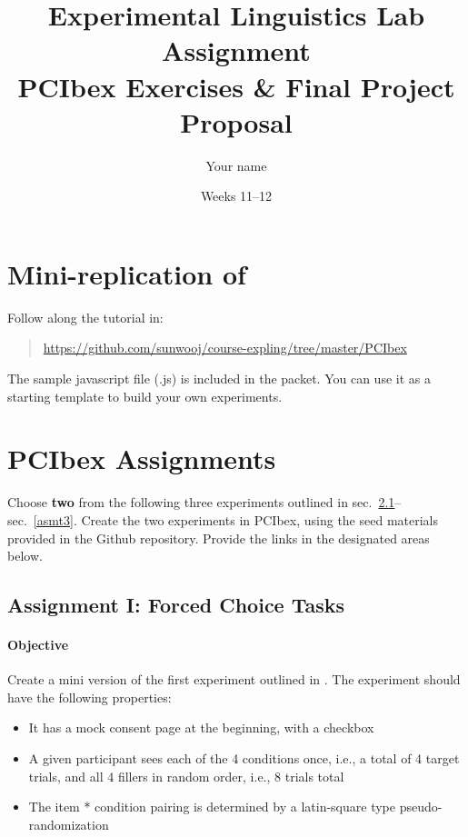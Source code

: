 \documentclass{article}
\title{Experimental Linguistics Lab Assignment \\ PCIbex Exercises \& Final Project Proposal}
\date{Weeks 11--12}
\author{Your name}
\begin{document}
\maketitle

\section{Mini-replication of \cite{sprouse2016}}

Follow along the tutorial in: 

\begin{quotation}
\noindent
\url{https://github.com/sunwooj/course-expling/tree/master/PCIbex}
\end{quotation}

\noindent The sample javascript file (.js) is included in the packet. You can use it as a starting template to build your own experiments.




\section{PCIbex Assignments}

Choose \textbf{two} from the following three experiments outlined in sec.~\ref{asmt1}--sec.~\ref{asmt3}. Create the two experiments in PCIbex, using the seed materials provided in the Github repository. Provide the links in the designated areas below.




\subsection{Assignment I: Forced Choice Tasks}\label{asmt1}

\paragraph{Objective} Create a mini version of the first experiment outlined in \cite{brasoveanu2015}. The experiment should have the following properties:

\begin{itemize}
    \item It has a mock consent page at the beginning, with a checkbox
    \item A given participant sees each of the 4 conditions once, i.e., a total of 4 target trials, and all 4 fillers in random order, i.e., 8 trials total
    \item The item * condition pairing is determined by a latin-square type pseudo-randomization
\end{itemize}
\end{document}
